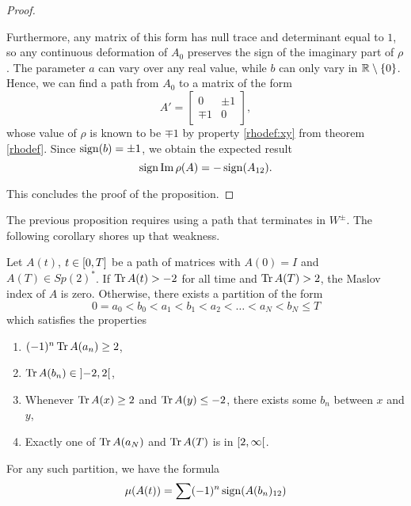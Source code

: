 \begin{proof}
\begin{lemmaproof}
Furthermore, any matrix of this form has null trace and determinant equal to $1$, so any continuous deformation of $A_0$ preserves the sign of the imaginary part of $\rho$. The parameter $a$ can vary over any real value, while $b$ can only vary in $\mathbb{R} \setminus \{0\}$. Hence, we can find a path from $A_0$ to a matrix of the form
\begin{equation}
A' = \begin{bmatrix}
0 & \pm 1\\
\mp 1 & 0
\end{bmatrix},
\end{equation}
whose value of $\rho$ is known to be $\mp 1$ by property \ref{rhodef:xy} from theorem \ref{rhodef}. Since $\operatorname{sign}(b) = \pm 1$, we obtain the expected result
\begin{equation}
\operatorname{sign} \operatorname{Im} \rho(A) = - \operatorname{sign}(A_{12}).
\end{equation}
\end{lemmaproof}
This concludes the proof of the proposition.
\end{proof}

The previous proposition requires using a path that terminates in $W^\pm$. The following corollary shores up that weakness.

\begin{corollary}\label{calcmaslov1}
Let $A(t)$, $t \in \interval 0 T$ be a path of matrices with $A(0) = I$ and $A(T) \in Sp(2)^*$. If $\operatorname{Tr} A(t) > -2$ for all time and $\operatorname{Tr} A(T) > 2$, the Maslov index of $A$ is zero. Otherwise, there exists a partition of the form
\begin{equation}
0 = a_0 < b_0 < a_1 < b_1 < a_2 < \dots < a_N < b_N \leq T
\end{equation}
which satisfies the properties
\begin{enumerate}
\item $(-1)^n \operatorname{Tr} A(a_n) \geq 2$,
\item $\trace A(b_n) \in \ointerval{-2}2$,
\item Whenever $\operatorname{Tr} A(x) \geq 2$ and $\operatorname{Tr} A(y) \leq -2$, there exists some $b_n$ between $x$ and $y$,
\item\label{calcmaslov:ab5} Exactly one of $\operatorname{Tr} A(a_N)$ and $\operatorname{Tr} A(T)$ is in $\rinterval 2 \infty$.
\end{enumerate}

For any such partition, we have the formula
\begin{equation}\label{calcmaslov:mu}
\mu(A(t)) = \sum (-1)^n \operatorname{sign}(A(b_n)_{12})
\end{equation}
\end{corollary}

